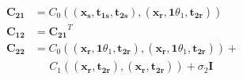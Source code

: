 \documentclass[12pt]{article}
\begin{document}
\begin{minipage}{.8\textwidth}
\begin{align*}
	\mathbf{C_{21}}&=C_0\left((\mathbf{x_s},\mathbf{t_{1s}},\mathbf{t_{2s}}),(\mathbf{x_r},\mathbf1\theta_1,\mathbf{t_{2r}})\right)\\
	\mathbf{C_{12}}&=\mathbf{C_{21}}^T\\
	\mathbf{C_{22}}&=C_0\left((\mathbf{x_r},\mathbf1\theta_1,\mathbf{t_{2r}}),(\mathbf{x_r},\mathbf1\theta_1,\mathbf{t_{2r}})\right) + \\
	&\phantom{iiii}C_1\left( (\mathbf{x_r},\mathbf{t_{2r}}),(\mathbf{x_r},\mathbf{t_{2r}}) \right) + \sigma_2 \mathbf I\\
	\end{align*}
\end{minipage}
\end{document}
